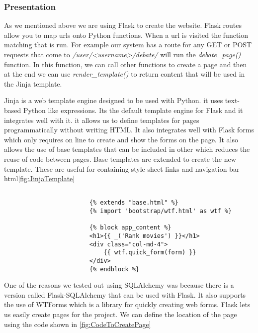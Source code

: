                 
        
                \subsubsection{Presentation}\label{sec:webDevelopment}


                    As we mentioned above we are using Flask to create the website. Flask routes allow you to map urls onto Python functions. When a url is visited the function matching that is run. For example our system has a route for any GET or POST requests that come to \textit{/user/<username>/debate/} will run the \textit{debate\_page()} function. In this function, we can call other functions to create a page and then at the end we can use \textit{render\_template()} to return content that will be used in the Jinja template.

                    Jinja is a web template engine designed to be used with Python. it uses text-based Python like expressions. Its the default template engine for Flask and it integrates well with it. it allows us to define templates for pages programmatically without writing HTML. It also integrates well with Flask forms which only requires on line to create and show the forms on the page. It also allows the use of base templates that can be included in other which reduces the reuse of code between pages. Base templates are extended to create the new template. These are useful for containing style sheet links and navigation bar html\ref{fig:JinjaTemplate}
                

                    \begin{lstlisting}[gobble=20, tabsize=4,  caption=Jinja template example, label=fig:JinjaTemplate]
    
                        {% extends "base.html" %}
                        {% import 'bootstrap/wtf.html' as wtf %}
                    
                        {% block app_content %}
                        <h1>{{ _('Rank movies') }}</h1>
                        <div class="col-md-4">
                            {{ wtf.quick_form(form) }}
                        </div>
                        {% endblock %}
                        \end{lstlisting}

                    One of the reasons we tested out using SQLAlchemy was because there is a version called Flask-SQLAlchemy that can be used with Flask. It also supports the use of WTForms which is a library for quickly creating web forms. Flask lets us easily create pages for the project. We can define the location of the page using the code shown in \ref{fig:CodeToCreatePage}


